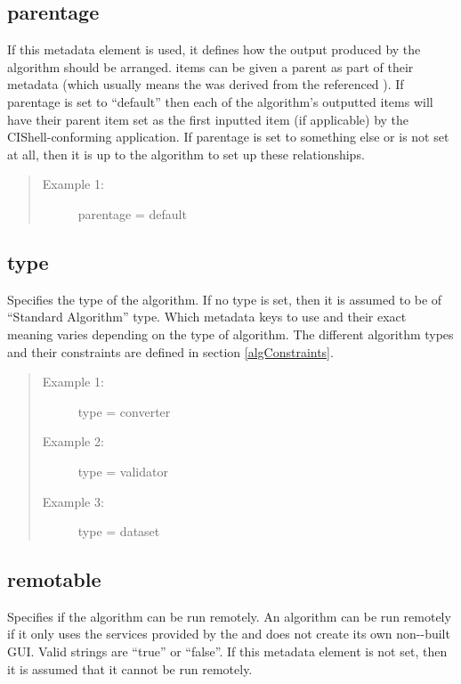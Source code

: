 \subsection*{parentage}
If this metadata element is used, it defines how the output 
produced by the algorithm should be arranged.  items can be given a parent as
part of their metadata (which usually means the  was derived from
the referenced ). If parentage is set to ``default'' then each of the
algorithm's outputted  items will have their parent  item
set as the first inputted  item (if applicable) by the
CIShell-conforming application. If parentage is set to something else or is not
set at all, then it is up to the algorithm to set up these relationships.

\begin{quote}
\begin{description}
  \item[Example 1:] parentage = default 
\end{description}
\end{quote}


\subsection*{type} 
Specifies the type of the algorithm. If no type is set, then
it is assumed to be of ``Standard Algorithm'' type. Which metadata keys to use
and their exact meaning varies depending on the type of algorithm. The different
algorithm types and their constraints are defined in section
\ref{algConstraints}.

\begin{quote}
\begin{description}
  \item[Example 1:] type = converter
  \item[Example 2:] type = validator
  \item[Example 3:] type = dataset 
\end{description}
\end{quote}


\subsection*{remotable}
Specifies if the algorithm can be run remotely. An algorithm can be run
remotely if it only uses the services provided by the 
and does not create its own non--built GUI. Valid
strings are ``true'' or ``false''. If this metadata element is not set, then
it is assumed that it cannot be run remotely.

